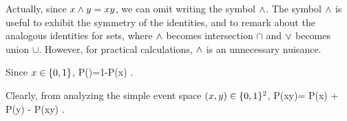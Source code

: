 Actually, since
$x\wedge y=xy$, we can omit writing
the symbol $\wedge$. The symbol
$\wedge$ is useful to
exhibit the symmetry
of the identities, and
to remark
about
the analogous identities
for sets, where
$\wedge$ becomes intersection $\cap$
and $\vee$ becomes union $\cup$. However,
for practical calculations,
$\wedge$ is an unnecessary nuisance.

Since $x\in \{0,1\}$,
\beq
P()=1-P(x)
\;.
\eeq

Clearly, from analyzing
the simple event space $(x,y)\in \{0,1\}^2$,
\beq
P(x\V y)= P(x) + P(y) - P(x\A y)
\;.
\eeq










